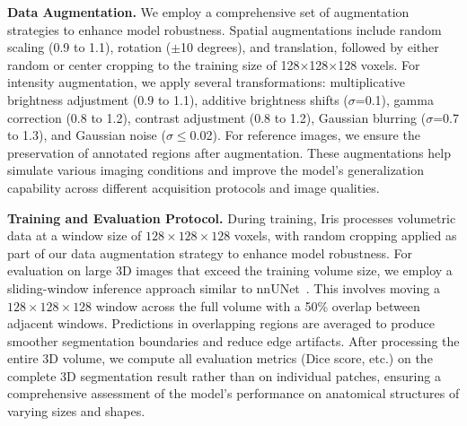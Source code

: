 \noindent\textbf{Data Augmentation.} We employ a comprehensive set of augmentation strategies to enhance model robustness. Spatial augmentations include random scaling (0.9 to 1.1), rotation ($\pm$10 degrees), and translation, followed by either random or center cropping to the training size of 128$\times$128$\times$128 voxels. For intensity augmentation, we apply several transformations: multiplicative brightness adjustment (0.9 to 1.1), additive brightness shifts ($\sigma$=0.1), gamma correction (0.8 to 1.2), contrast adjustment (0.8 to 1.2), Gaussian blurring ($\sigma$=0.7 to 1.3), and Gaussian noise ($\sigma\leq$0.02). For reference images, we ensure the preservation of annotated regions after augmentation. These augmentations help simulate various imaging conditions and improve the model's generalization capability across different acquisition protocols and image qualities.

\noindent\textbf{Training and Evaluation Protocol.} During training, Iris processes volumetric data at a window size of $128\times128\times128$ voxels, with random cropping applied as part of our data augmentation strategy to enhance model robustness. For evaluation on large 3D images that exceed the training volume size, we employ a sliding-window inference approach similar to nnUNet~\cite{isensee2021nnu}. This involves moving a $128\times128\times128$ window across the full volume with a 50\% overlap between adjacent windows. Predictions in overlapping regions are averaged to produce smoother segmentation boundaries and reduce edge artifacts. After processing the entire 3D volume, we compute all evaluation metrics (Dice score, etc.) on the complete 3D segmentation result rather than on individual patches, ensuring a comprehensive assessment of the model's performance on anatomical structures of varying sizes and shapes.